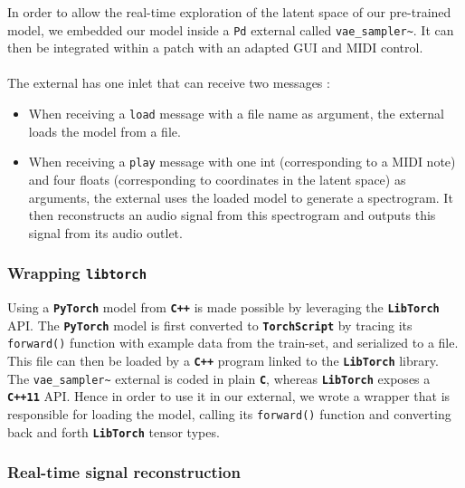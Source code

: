 \documentclass[11pt, english]{article}
\begin{document}
In order to allow the real-time exploration of the latent space of our pre-trained model, we embedded our model inside a \texttt{Pd} external called \texttt{vae\_sampler\~}. It can then be integrated within a patch with an adapted GUI and MIDI control.
\paragraph{}
The external has one inlet that can receive two messages :
\begin{itemize}
\item When receiving a \texttt{load} message with a file name as argument, the external loads the model from a file.
\item When receiving a \texttt{play} message with one int (corresponding to a MIDI note) and four floats (corresponding to coordinates in the latent space) as arguments, the external uses the loaded model to generate a spectrogram. It then reconstructs an audio signal from this spectrogram and outputs this signal from its audio outlet.
\end{itemize}

\subsubsection{Wrapping \texttt{libtorch}}

Using a \textbf{\texttt{PyTorch}} model from \textbf{\texttt{C++}} is made possible by leveraging the \textbf{\texttt{LibTorch}} API. The \textbf{\texttt{PyTorch}} model is first converted to \textbf{\texttt{TorchScript}} by tracing its \texttt{forward()} function with example data from the train-set, and serialized to a file. This file can then be loaded by a \textbf{\texttt{C++}} program linked to the \textbf{\texttt{LibTorch}} library. \newline
The \texttt{vae\_sampler\~} external is coded in plain \textbf{\texttt{C}}, whereas \textbf{\texttt{LibTorch}} exposes a \textbf{\texttt{C++11}} API. Hence in order to use it in our external, we wrote a wrapper that is responsible for loading the model, calling its \texttt{forward()} function and converting back and forth \textbf{\texttt{LibTorch}} tensor types.

\subsubsection{Real-time signal reconstruction}
\end{document}
